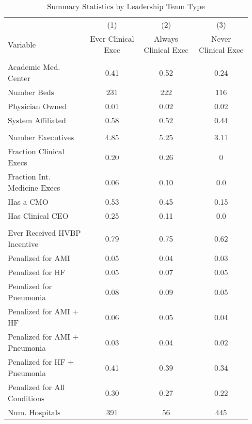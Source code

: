 \begin{table}[ht!]
\centering
\caption{\label{tab:sumstats_samples_stable}Summary Statistics by Leadership Team Type}
\centering
\begin{tabular}[t]{lccc}
\toprule
 & (1) & (2) & (3) \\
Variable & Ever Clinical Exec & Always Clinical Exec & Never Clinical Exec\\
\midrule
\addlinespace[0.3em]
\multicolumn{4}{l}{\textbf{Hospital Characteristics}}\\
\hspace{1em}Academic Med. Center & 0.41 & 0.52 & 0.24\\
\hspace{1em}Number Beds & 231 & 222 & 116\\
\hspace{1em}Physician Owned & 0.01 & 0.02 & 0.02\\
\hspace{1em}System Affiliated & 0.58 & 0.52 & 0.44\\
\addlinespace[0.3em]
\multicolumn{4}{l}{\textbf{Executive Team Characteristics}}\\
\hspace{1em}Number Executives & 4.85 & 5.25 & 3.11\\
\hspace{1em}Fraction Clinical Execs & 0.20 & 0.26 & 0\\
\hspace{1em}Fraction Int. Medicine Execs & 0.06 & 0.10 & 0.0\\
\hspace{1em}Has a CMO & 0.53 & 0.45 & 0.15\\
\hspace{1em}Has Clinical CEO & 0.25 & 0.11 & 0.0\\
\addlinespace[0.3em]
\multicolumn{4}{l}{\textbf{Penalty/Payment Variables}}\\
\hspace{1em}Ever Received HVBP Incentive & 0.79 & 0.75 & 0.62\\
\hspace{1em}Penalized for AMI & 0.05 & 0.04 & 0.03\\
\hspace{1em}Penalized for HF & 0.05 & 0.07 & 0.05\\
\hspace{1em}Penalized for Pneumonia & 0.08 & 0.09 & 0.05\\
\hspace{1em}Penalized for AMI + HF & 0.06 & 0.05 & 0.04\\
\hspace{1em}Penalized for AMI + Pneumonia & 0.03 & 0.04 & 0.02\\
\hspace{1em}Penalized for HF + Pneumonia & 0.41 & 0.39 & 0.34\\
\hspace{1em}Penalized for All Conditions & 0.30 & 0.27 & 0.22\\
Num. Hospitals & 391 & 56 & 445\\
\bottomrule
\end{tabular}
\end{table}
